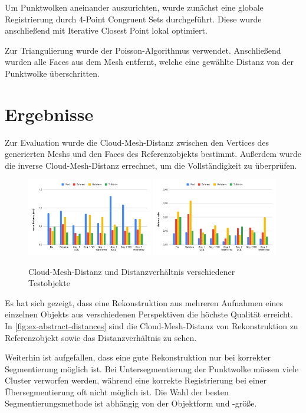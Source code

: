 \begin{refsection}
Um Punktwolken aneinander auszurichten, wurde zunächst eine globale Registrierung durch 4-Point Congruent Sets \cite{aiger2008fpcs} durchgeführt.
Diese wurde anschließend mit Iterative Closest Point \cite{besl1992method} lokal optimiert.

Zur Triangulierung wurde der Poisson-Algorithmus \cite{kazhdan2006poisson} verwendet. Anschließend wurden alle Faces aus dem Mesh entfernt, welche eine gewählte Distanz von der Punktwolke überschritten.


\section*{Ergebnisse}

Zur Evaluation wurde die Cloud-Mesh-Distanz zwischen den Vertices des generierten Meshs und den Faces des Referenzobjekts bestimmt.
Außerdem wurde die inverse Cloud-Mesh-Distanz errechnet, um die Vollständigkeit zu überprüfen.

\begin{figure}[H]
    \includegraphics[width=0.49\textwidth]{images/segmentation/meanDistance1.png}
    \includegraphics[width=0.49\textwidth]{images/segmentation/ratio.png}
    \caption{Cloud-Mesh-Distanz und Distanzverhältnis verschiedener Testobjekte}
    \label{fig:ex-abstract-distances}
\end{figure}

Es hat sich gezeigt, dass eine Rekonstruktion aus mehreren Aufnahmen eines einzelnen Objekts aus verschiedenen Perspektiven die höchste Qualität erreicht.
In \autoref{fig:ex-abstract-distances} sind die Cloud-Mesh-Distanz von Rekonstruktion zu Referenzobjekt sowie das Distanzverhältnis zu sehen.

Weiterhin ist aufgefallen, dass eine gute Rekonstruktion nur bei korrekter Segmentierung möglich ist.
Bei Untersegmentierung der Punktwolke müssen viele Cluster verworfen werden, während eine korrekte Registrierung bei einer Übersegmentierung oft nicht möglich ist.
Die Wahl der besten Segmentierungsmethode ist abhängig von der Objektform und -größe.


\printbibliography[heading=subbibliography]

\end{refsection}
\newpage
